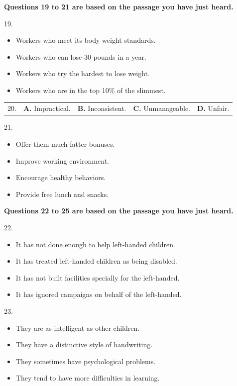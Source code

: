 \documentclass[UTF8,11pt]{ctexart}
\begin{document}
\textbf{Questions 19 to 21 are based on the passage you have just heard.}


19.


\begin{itemize}[leftmargin=2em,itemsep=.2em,topsep=.4em]\item[A.] Workers who meet its body weight standards.
\item[B.] Workers who can lose 30 pounds in a year.
\item[C.] Workers who try the hardest to lose weight.
\item[D.] Workers who are in the top 10\% of the slimmest.
\end{itemize}

\noindent\begin{tabularx}{\linewidth}{@{}lXXXX@{}}20. & \textbf{A.} Impractical. & \textbf{B.} Inconsistent. & \textbf{C.} Unmanageable. & \textbf{D.} Unfair.\\\end{tabularx}\par

21.


\begin{itemize}[leftmargin=2em,itemsep=.2em,topsep=.4em]\item[A.] Offer them much fatter bonuses.
\item[B.] Improve working environment.
\item[C.] Encourage healthy behaviors.
\item[D.] Provide free lunch and snacks.
\end{itemize}

\textbf{Questions 22 to 25 are based on the passage you have just heard.}


22.


\begin{itemize}[leftmargin=2em,itemsep=.2em,topsep=.4em]\item[A.] It has not done enough to help left-handed children.
\item[B.] It has treated left-handed children as being disabled.
\item[C.] It has not built facilities specially for the left-handed.
\item[D.] It has ignored campaigns on behalf of the left-handed.
\end{itemize}

23.


\begin{itemize}[leftmargin=2em,itemsep=.2em,topsep=.4em]\item[A.] They are as intelligent as other children.
\item[B.] They have a distinctive style of handwriting.
\item[C.] They sometimes have psychological problems.
\item[D.] They tend to have more difficulties in learning.
\end{itemize}
\end{document}

